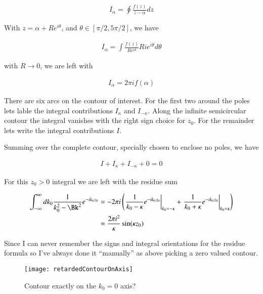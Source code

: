 \begin{align}\label{eqn:jacksonRet:boo10}
I_\alpha = \oint \frac{f(z)}{z - \alpha} dz
\end{align}

With $z = \alpha + R e^{i\theta}$, and $\theta \in [\pi/2, 5\pi/2]$, we have

\begin{align}\label{eqn:jacksonRet:boo11}
I_\alpha = \int \frac{f(z)}{R e^{i\theta}} R i e^{i\theta} d\theta
\end{align}

with $R \rightarrow 0$, we are left with 

\begin{align}\label{eqn:jacksonRet:boo12}
I_\alpha = 2 \pi i f(\alpha)
\end{align}

There are six arcs on the contour of interest.  For the first two around the poles lets lable the integral contributions $I_\kappa$ and $I_{-\kappa}$.  Along the infinite semicircular contour the integral vanishes with the right sign choice for $z_0$.  For the remainder lets write the integral contributions $I$.

Summing over the complete contour, specially chosen to enclose no poles, we have

\begin{align}\label{eqn:jacksonRet:boo13}
I + I_\kappa + I_{-\kappa} + 0 = 0 
\end{align}

For this $z_0 > 0$ integral we are left with the residue sum

\begin{align*}
\int_{-\infty}^\infty dk_0 \inv{k_0^2 - \Bk^2} e^{-i k_0 z_0} 
&= 
- 2 \pi i \left( 
{\left. \inv{k_0 - \kappa} e^{-i k_0 z_0} \right\vert}_{k_0 = -\kappa}
+{\left. \inv{k_0 + \kappa} e^{-i k_0 z_0} \right\vert}_{k_0 = \kappa}
\right) \\
&= 
\frac{2 \pi i^2}{\kappa} \sin(\kappa z_0)
\end{align*}

Since I can never remember the signs and integral orientations for the residue formula so I've always done it ``manually'' as above picking a zero valued contour.

\begin{figure}[htp]
\centering
\texttt{[image: retardedContourOnAxis]}
\caption{Contour exactly on the $k_0 = 0$ axis?}\label{fig:jacksonRet:retardedContourOnAxis}
\end{figure}

